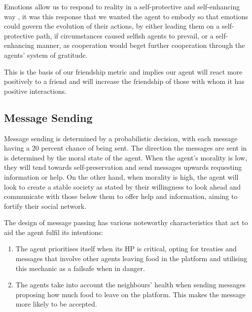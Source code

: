 Emotions allow us to respond to reality in a self-protective and self-enhancing way \cite{ekman_1992}, it was this response that we wanted the agent to embody so that emotions could govern the evolution of their actions, by either leading them on a self-protective path, if circumstances caused selfish agents to prevail, or a self-enhancing manner, as cooperation would beget further cooperation through the agents' system of gratitude.\par
This is the basis of our friendship metric and implies our agent will react more positively to a friend and will increase the friendship of those with whom it has positive interactions.

\subsection{Message Sending}
Message sending is determined by a probabilistic decision, with each message having a 20 percent chance of being sent. The direction the messages are sent in is determined by the moral state of the agent. When the agent's morality is low, they will tend towards self-preservation and send messages upwards requesting information or help. On the other hand, when morality is high, the agent will look to create a stable society as stated by their willingness to look ahead and communicate with those below them to offer help and information, aiming to fortify their social network.\par 
The design of message passing has various noteworthy characteristics that act to aid the agent fulfil its intentions:
\begin{enumerate}
    \item The agent prioritises itself when its HP is critical, opting for treaties and messages that involve other agents leaving food in the platform and utilising this mechanic as a failsafe when in danger.
    \item The agents take into account the neighbours' health when sending messages proposing how much food to leave on the platform. This makes the message more likely to be accepted. 
\end{enumerate}

